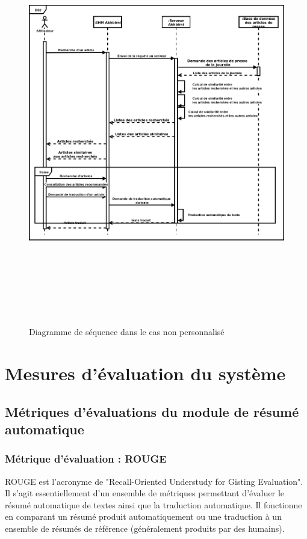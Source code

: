 \begin{figure}[H]
    \centering
    \includegraphics[height=500pt,width=425pt]{img/chapter3/diagseqnonperso.png}
    \caption{Diagramme de séquence dans le cas non personnalisé}
\end{figure}






\section{Mesures d'évaluation du système}

\subsection{Métriques d'évaluations du module de résumé automatique}

\subsubsection{Métrique d'évaluation : ROUGE\label{metrique-eval}}
ROUGE est l'acronyme de "Recall-Oriented Understudy for Gisting Evaluation". Il s'agit essentiellement d'un ensemble de métriques permettant d'évaluer le résumé automatique de textes ainsi que la traduction automatique. Il fonctionne en comparant un résumé produit automatiquement ou une traduction à un ensemble de résumés de référence (généralement produits par des humains). \cite{rouge0}


